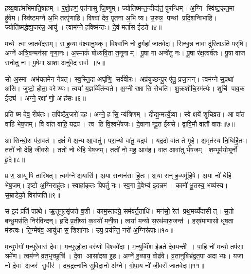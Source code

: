 ह॒व्य॒वाह॑मभिमाति॒षाहम्। र॒क्षो॒हणं॒ पृत॑नासु जि॒ष्णुम्। ज्योति॑ष्मन्त॒न्दीद्य॑तं॒ पुर॑न्धिम्। अ॒ग्नि स्वि॑ष्ट॒कृत॒मा हु॑वेम। स्वि॑ष्टमग्ने अ॒भि तत्पृ॑णाहि। विश्वा॑ देव॒ पृत॑ना अ॒भि ष्य। उ॒रुन्न॒ पन्थां प्रदि॒शन्विभा॑हि। ज्योति॑ष्मद्धेह्य॒जर॑न्न॒ आयु॑। त्वाम॑ग्ने ह॒विष्म॑न्तः। दे॒वं मर्ता॑स ईडते॥४॥

मन्ये त्वा जा॒तवे॑दसम्। स ह॒व्या व॑क्ष्यानु॒षक्। विश्वा॑नि नो दु॒र्गहा॑ जातवेदः। सिन्धु॒न्न ना॒वा दु॑रि॒ताऽति॑ पर्‌षि। अग्ने॑ अत्रि॒वन्मन॑सा गृणा॒नः। अ॒स्माकं॑ बोध्यवि॒ता त॒नूनाम्। पू॒षा गा अन्वे॑तु नः। पू॒षा र॑क्ष॒त्वर्व॑तः। पू॒षा वाज सनोतु नः। पू॒षेमा आशा॒ अनु॑वेद॒ सर्वा॥५॥

सो अ॒स्मा अभ॑यतमेन नेषत्। स्व॒स्ति॒दा अघृ॑णि॒ सर्व॑वीरः। अप्र॑युच्छन्पु॒र ए॑तु॒ प्रजा॒नन्। त्वम॑ग्ने स॒प्रथा॑ असि। जुष्टो॒ होता॒ वरेण्यः। त्वया॑ य॒ज्ञव्विँत॑न्वते। अ॒ग्नी रक्षासि सेधति। शु॒क्रशो॑चि॒रम॑र्त्यः। शुचि॑ पाव॒क ईड्य॑। अग्ने॒ रक्षा॑ णो॒ अह॑सः॥६॥

प्रति॑ ष्म देव॒ रीष॑तः। तपि॑ष्ठैर॒जरो॑ दह। अग्ने॒ हसि॒ न्य॑त्रिणम्। दीद्य॒न्मर्त्ये॒ष्वा। स्वे क्षये॑ शुचिव्रत। आ वा॑त वाहि भेष॒जम्। वि वा॑त वाहि॒ यद्रप॑। त्व हि वि॒श्वभे॑षजः। दे॒वानान्दू॒त ईय॑से। द्वावि॒मौ वातौ॑ वातः॥७॥

आ सिन्धो॒रा प॑रा॒वत॑। दक्षं॑ मे अ॒न्य आ॒वातु॑। परा॒न्यो वा॑तु॒ यद्रप॑। यद॒दो वा॑त ते गृ॒हे। अ॒मृत॑स्य नि॒धिर्\mbox{}हि॒तः। ततो॑ नो देहि जी॒वसे। ततो॑ नो धेहि भेष॒जम्। ततो॑ नो॒ मह॒ आव॑ह। वात॒ आवा॑तु भेष॒जम्। श॒म्भूर्म॑यो॒भूर्नो॑ हृ॒दे॥८॥

प्र ण॒ आयूषि तारिषत्। त्वम॑ग्ने अ॒यासि॑। अ॒या सन्मन॑सा हि॒तः। अ॒या सन् ह॒व्यमू॑हिषे। अ॒या नो॑ धेहि भेष॒जम्। इ॒ष्टो अ॒ग्निराहु॑तः। स्वाहा॑कृतः पिपर्तु नः। स्व॒गा दे॒वेभ्य॑ इ॒दन्नम॑। कामो॑ भू॒तस्य॒ भव्य॑स्य। स॒म्राडेको॒ विरा॑जति॥९॥

स इ॒दं प्रति॑ पप्रथे। ऋ॒तूनुत्सृ॑जते व॒शी। काम॒स्तदग्रे॒ सम॑वर्त॒ताधि॑। मन॑सो॒ रेत॑ प्रथ॒मय्यँदासीत्। स॒तो बन्धु॒मस॑ति॒ निर॑विन्दन्। हृ॒दि प्र॒तीष्या॑ क॒वयो॑ मनी॒षा। त्वया॑ मन्यो स॒रथ॑मारु॒जन्त॑। हर्‌ष॑माणासो धृष॒ता म॑रुत्वः। ति॒ग्मेष॑व॒ आयु॑धा स॒शिशा॑नाः। उप॒ प्रय॑न्ति॒ नरो॑ अ॒ग्निरू॑पाः॥१०॥

म॒न्युर्भगो॑ म॒न्युरे॒वास॑ दे॒वः। म॒न्युर्‌होता॒ वरु॑णो वि॒श्ववे॑दाः। म॒न्युव्विँश॑ ईडते देव॒यन्ती। पा॒हि नो॑ मन्यो॒ तप॑सा॒ श्रमे॑ण। त्वम॑ग्ने व्रत॒भृच्छुचि॑। दे॒वा आसा॑दया इ॒ह। अग्ने॑ ह॒व्याय॒ वोढ॑वे। व्र॒तानुबिभ्र॑द्व्रत॒पा अदाभ्यः। यजा॑ नो दे॒वा अ॒जर॑ सु॒वीर॑। दध॒द्रत्ना॑नि सुविदा॒नो अ॑ग्ने। गो॒पा॒य नो॑ जी॒वसे॑ जातवेदः॥११॥\anuvakamend[जिघासत्य॒मित्राञ्जघ॒न्वानी॑डते॒ सर्वा॒ अह॑सो वातो हृ॒दे रा॑जत्य॒ग्निरू॑पाः सुविदा॒नो अ॑ग्न॒ एकं च]

